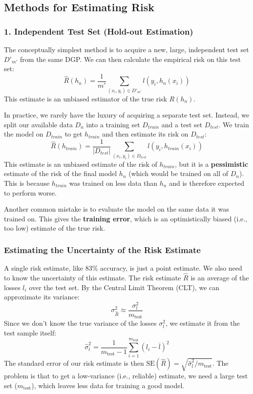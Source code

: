 \documentclass{article}
\begin{document}
\begin{multicols}{2}
\subsection{Methods for Estimating Risk}

\subsubsection{1. Independent Test Set (Hold-out Estimation)}
The conceptually simplest method is to acquire a new, large, independent test set $D'_{m'}$ from the same DGP. We can then calculate the empirical risk on this test set:
$$ \hat{R}(h_n) = \frac{1}{m'} \sum_{(x_i, y_i) \in D'_{m'}} l(y_i, h_n(x_i)) $$
This estimate is an unbiased estimator of the true risk $R(h_n)$.

In practice, we rarely have the luxury of acquiring a separate test set. Instead, we split our available data $D_n$ into a training set $D_{train}$ and a test set $D_{test}$. We train the model on $D_{train}$ to get $h_{train}$ and then estimate its risk on $D_{test}$:
$$ \hat{R}(h_{train}) = \frac{1}{|D_{test}|} \sum_{(x_i, y_i) \in D_{test}} l(y_i, h_{train}(x_i)) $$
This estimate is an unbiased estimate of the risk of $h_{train}$, but it is a \textbf{pessimistic} estimate of the risk of the final model $h_n$ (which would be trained on all of $D_n$). This is because $h_{train}$ was trained on less data than $h_n$ and is therefore expected to perform worse.

Another common mistake is to evaluate the model on the same data it was trained on. This gives the \textbf{training error}, which is an optimistically biased (i.e., too low) estimate of the true risk.

\subsubsection{Estimating the Uncertainty of the Risk Estimate}
A single risk estimate, like 83\% accuracy, is just a point estimate. We also need to know the uncertainty of this estimate. The risk estimate $\hat{R}$ is an average of the losses $l_i$ over the test set. By the Central Limit Theorem (CLT), we can approximate its variance:
$$ \sigma^2_{\hat{R}} \approx \frac{\sigma^2_l}{m_{\text{test}}} $$
Since we don't know the true variance of the losses $\sigma^2_l$, we estimate it from the test sample itself:
$$ \hat{\sigma}^2_l = \frac{1}{m_{\text{test}}-1} \sum_{i=1}^{m_{\text{test}}} (l_i - \bar{l})^2 $$
The standard error of our risk estimate is then $\text{SE}(\hat{R}) = \sqrt{\hat{\sigma}^2_l / m_{\text{test}}}$. The problem is that to get a low-variance (i.e., reliable) estimate, we need a large test set ($m_{\text{test}}$), which leaves less data for training a good model.


\end{multicols}
\end{document}
